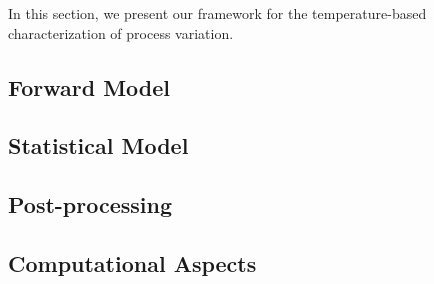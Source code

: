 In this section, we present our framework for the temperature-based characterization of process variation.

\subsection{Forward Model}   


\subsection{Statistical Model} 


\subsection{Post-processing} 


\subsection{Computational Aspects} 

